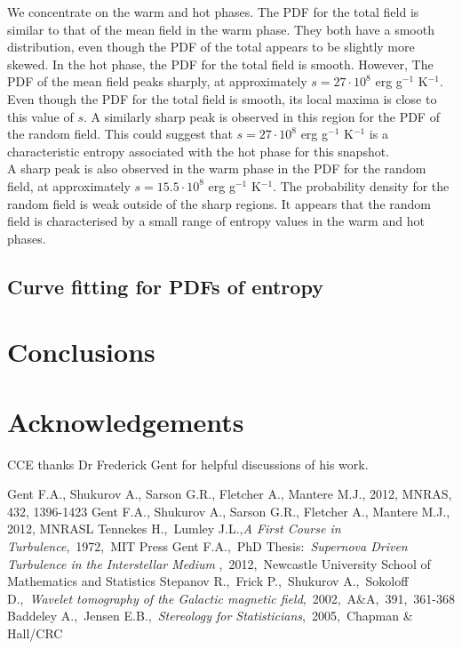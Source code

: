 \documentclass[useAMS,usenatbib]{mn2e}
\begin{document}
We concentrate on the warm and hot phases. The PDF for the total field is similar to that of the mean field in the warm phase. They both have a smooth distribution, even though the PDF of the total appears to be slightly more skewed. In the hot phase, the PDF for the total field is smooth. However, The PDF of the mean field peaks sharply, at approximately $s=27\cdot10^8$ erg g$^{-1}$ K$^{-1}$. Even though the PDF for the total field is smooth, its local maxima is close to this value of $s$. A similarly sharp peak is observed in this region for the PDF of the random field. This could suggest that $s=27\cdot10^8$ erg g$^{-1}$ K$^{-1}$ is a characteristic entropy associated with the hot phase for this snapshot. \\
A sharp peak is also observed in the warm phase in the PDF for the random field, at approximately $s=15.5\cdot10^8$ erg g$^{-1}$ K$^{-1}$. The probability density for the random field is weak outside of the sharp regions. It appears that the random field is characterised by a small range of entropy values in the warm and hot phases. 
\subsection{Curve fitting for PDFs of entropy}

 
\section{Conclusions}

\newpage
\section*{Acknowledgements}

CCE thanks Dr Frederick Gent for helpful discussions of his work.


\begin{thebibliography}{99}
 Gent F.A., Shukurov A., Sarson G.R., Fletcher A., Mantere M.J., 2012, MNRAS, 432, 1396-1423
 Gent F.A., Shukurov A., Sarson G.R., Fletcher A., Mantere M.J., 2012, MNRASL
 Tennekes H.,~Lumley J.L.,\emph{A First Course in Turbulence},~1972,~MIT Press
 Gent F.A.,~PhD Thesis:~\emph{Supernova Driven Turbulence in the Interstellar Medium} ,~2012,~Newcastle University School of Mathematics and Statistics%
 Stepanov R.,~Frick P.,~Shukurov A.,~Sokoloff D.,~\emph{Wavelet tomography of the Galactic magnetic field},~2002,~A\&A,~391,~361-368
 Baddeley A.,~Jensen E.B.,~\emph{Stereology for Statisticians},~2005,~Chapman \& Hall/CRC
\end{thebibliography}
\end{document}
